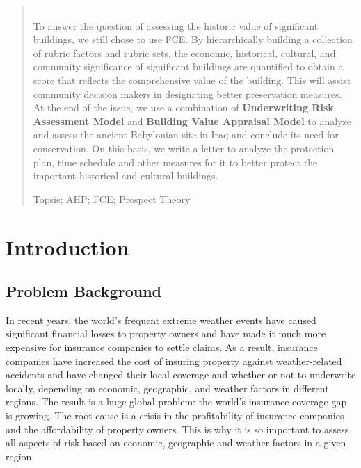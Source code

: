\documentclass{mcmthesis}
\begin{document}
\begin{abstract}
\\
To answer the question of assessing the historic value of significant buildings, we still chose to use FCE. By hierarchically building a collection of rubric factors and rubric sets, the economic, historical, cultural, and community significance of significant buildings are quantified to obtain a score that reflects the comprehensive value of the building. This will assist community decision makers in designating better preservation measures.
\\
At the end of the issue, we use a combination of \textbf{Underwriting Risk Assessment Model} and \textbf{Building Value Appraisal Model} to analyze and assess the ancient Babylonian site in Iraq and conclude its need for conservation. On this basis, we write a letter to analyze the protection plan, time schedule and other measures for it to better protect the important historical and cultural buildings.
\\
\begin{keywords}
Topsis; AHP; FCE; Prospect Theory 
\end{keywords}
\end{abstract}
\maketitle
\begin{spacing}{1}
 \tableofcontents
\end{spacing}
 \newpage




\section{Introduction}

\subsection{Problem Background}
In recent years, the world's frequent extreme weather events have caused significant financial losses to property owners and have made it much more expensive for insurance companies to settle claims. As a result, insurance companies have increased the cost of insuring property against weather-related accidents and have changed their local coverage and whether or not to underwrite locally, depending on economic, geographic, and weather factors in different regions. The result is a huge global problem: the world's insurance coverage gap is growing. The root cause is a crisis in the profitability of insurance companies and the affordability of property owners. This is why it is so important to assess all aspects of risk based on economic, geographic and weather factors in a given region.
\end{document}
